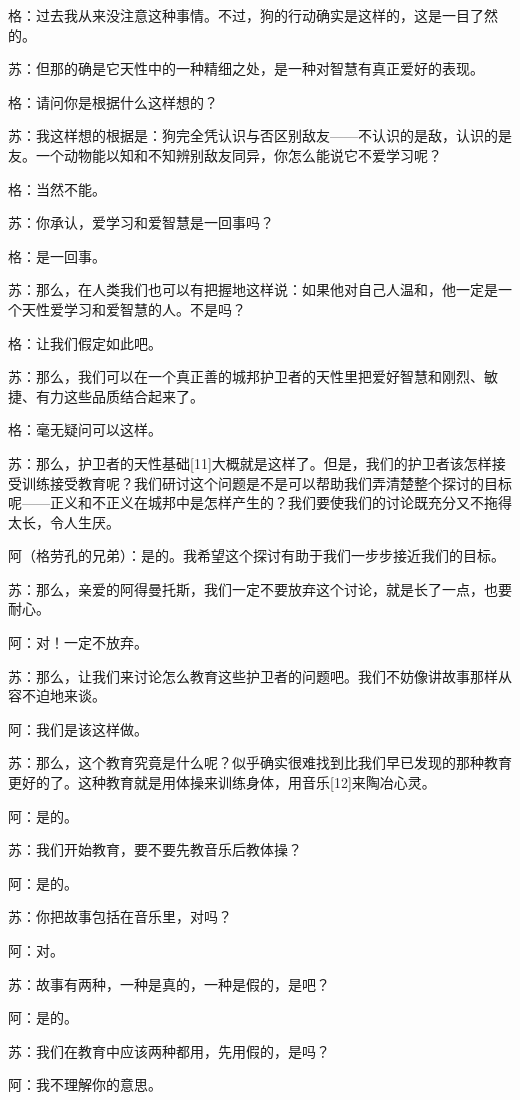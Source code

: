 \documentclass[12pt,oneside]{book}
\begin{document}
格：过去我从来没注意这种事情。不过，狗的行动确实是这样的，这是一目了然的。

苏：但那的确是它天性中的一种精细之处，是一种对智慧有真正爱好的表现。

格：请问你是根据什么这样想的？

苏：我这样想的根据是：狗完全凭认识与否区别敌友——不认识的是敌，认识的是友。一个动物能以知和不知辨别敌友同异，你怎么能说它不爱学习呢？

格：当然不能。

苏：你承认，爱学习和爱智慧是一回事吗？

格：是一回事。

苏：那么，在人类我们也可以有把握地这样说：如果他对自己人温和，他一定是一个天性爱学习和爱智慧的人。不是吗？

格：让我们假定如此吧。

苏：那么，我们可以在一个真正善的城邦护卫者的天性里把爱好智慧和刚烈、敏捷、有力这些品质结合起来了。

格：毫无疑问可以这样。

苏：那么，护卫者的天性基础[11]大概就是这样了。但是，我们的护卫者该怎样接受训练接受教育呢？我们研讨这个问题是不是可以帮助我们弄清楚整个探讨的目标呢——正义和不正义在城邦中是怎样产生的？我们要使我们的讨论既充分又不拖得太长，令人生厌。

阿（格劳孔的兄弟）：是的。我希望这个探讨有助于我们一步步接近我们的目标。

苏：那么，亲爱的阿得曼托斯，我们一定不要放弃这个讨论，就是长了一点，也要耐心。

阿：对！一定不放弃。

苏：那么，让我们来讨论怎么教育这些护卫者的问题吧。我们不妨像讲故事那样从容不迫地来谈。

阿：我们是该这样做。

苏：那么，这个教育究竟是什么呢？似乎确实很难找到比我们早已发现的那种教育更好的了。这种教育就是用体操来训练身体，用音乐[12]来陶冶心灵。

阿：是的。

苏：我们开始教育，要不要先教音乐后教体操？

阿：是的。

苏：你把故事包括在音乐里，对吗？

阿：对。

苏：故事有两种，一种是真的，一种是假的，是吧？

阿：是的。

苏：我们在教育中应该两种都用，先用假的，是吗？

阿：我不理解你的意思。
\end{document}
